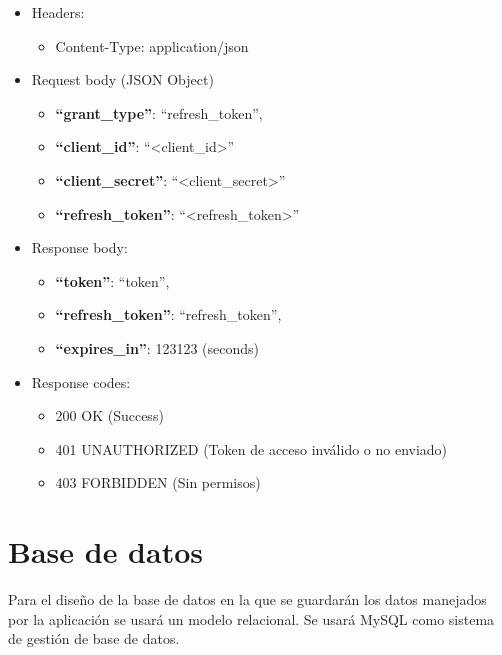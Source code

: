 \documentclass[12pt,a4paperpaper,]{report}
\providecommand{\tightlist}{%
  \setlength{\itemsep}{0pt}\setlength{\parskip}{0pt}}
\begin{document}
\begin{itemize}
\tightlist
\item
  Headers:

  \begin{itemize}
  \tightlist
  \item
    Content-Type: application/json
  \end{itemize}
\item
  Request body (JSON Object)

  \begin{itemize}
  \tightlist
  \item
    \textbf{``grant\_type''}: ``refresh\_token'',
  \item
    \textbf{``client\_id''}: ``\textless{}client\_id\textgreater{}''
  \item
    \textbf{``client\_secret''}:
    ``\textless{}client\_secret\textgreater{}''
  \item
    \textbf{``refresh\_token''}:
    ``\textless{}refresh\_token\textgreater{}''
  \end{itemize}
\item
  Response body:

  \begin{itemize}
  \tightlist
  \item
    \textbf{``token''}: ``token'',
  \item
    \textbf{``refresh\_token''}: ``refresh\_token'',
  \item
    \textbf{``expires\_in''}: 123123 (seconds)
  \end{itemize}
\item
  Response codes:

  \begin{itemize}
  \tightlist
  \item
    200 OK (Success)
  \item
    401 UNAUTHORIZED (Token de acceso inválido o no enviado)
  \item
    403 FORBIDDEN (Sin permisos)
  \end{itemize}
\end{itemize}

\section{Base de datos}\label{base-de-datos}

Para el diseño de la base de datos en la que se guardarán los datos
manejados por la aplicación se usará un modelo relacional. Se usará
MySQL como sistema de gestión de base de datos.
\end{document}
